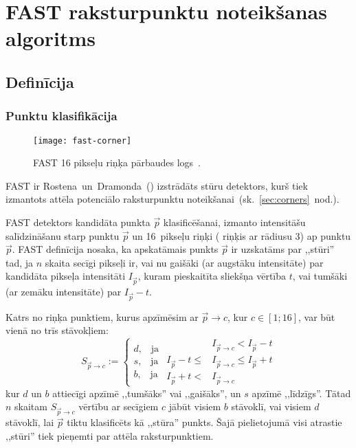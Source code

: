 \section{FAST raksturpunktu noteikšanas algoritms} \label{sec:fast}
\setcounter{lstlisting}{0} %

\newcommand{\Ip}{I_{\vec{p}}}
\newcommand{\Ipc}{ {I_{\vec{p} \to c}} }
\newcommand{\Spc}{ {S_{\vec{p} \to c}} }

\subsection{Definīcija} \label{sec:fast-def}
\subsubsection{Punktu klasifikācija}

\begin{figure}[tbh]
	\centering
	\texttt{[image: fast-corner]}
	\caption{FAST 16 pikseļu riņķa pārbaudes logs~\cite{FAST}.}
	\label{fig:fast}
\end{figure}

FAST ir Rostena~un~Dramonda\cite{FAST}~()
izstrādāts stūru detektors, kurš tiek izmantots attēla potenciālo 
raksturpunktu noteikšanai~(sk.~\ref{sec:corners}~nod.).

FAST detektors kandidāta punkta $\vec{p}$ klasificēšanai, izmanto intensitāšu
salīdzināšanu starp punktu $\vec{p}$ un 16~pikseļu riņķi ( riņķis
ar rādiusu 3) ap punktu $\vec{p}$. 
FAST definīcija nosaka, ka apskatāmais punkts $\vec{p}$ ir uzskatāms par
,,stūri'' tad, ja $n$ skaita secīgi pikseļi ir, vai nu gaišāki
(ar augstāku intensitāte) par kandidāta pikseļa intensitāti $\Ip$, kuram
pieskaitīta sliekšņa vērtība $t$, vai tumšāki (ar zemāku intensitāte) par
$\Ip - t$. \cite{Rosten-tracking}\cite{FAST}

Katrs no riņķa punktiem, kurus apzīmēsim ar $\vec{p}\to c$, kur $c \in [1; 16]$,
var būt vienā no trīs stāvokļiem:
\begin{equation}\label{eq:fast}
	\Spc := \left\{
		\begin{array}{c}
			d\text{,}\quad\text{ja}\\
			s\text{,}\quad\text{ja}\\
			b\text{,}\quad\text{ja}
		\end{array}
		\begin{aligned}
			           & \Ipc < \Ip-t \\
			\Ip-t \leq & \Ipc \leq \Ip+t \\
			   \Ip+t < & \Ipc
		\end{aligned}
		\right.
\end{equation}
kur $d$ un $b$ attiecīgi apzīmē ,,tumšāks'' vai ,,gaišāks'', un $s$ apzīmē
,,līdzīgs''. Tātad $n$ skaitam $\Spc$ vērtību ar secīgiem $c$ jābūt visiem
$b$ stāvoklī, vai visiem $d$ stāvoklī, lai $\vec{p}$ tiktu klasificēts kā
,,stūra'' punkts. Šajā pielietojumā visi atrastie ,,stūri'' tiek pieņemti
par attēla raksturpunktiem.

